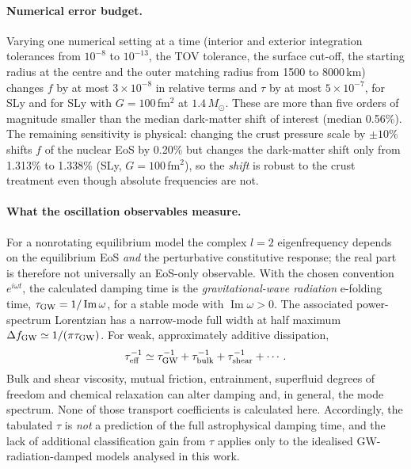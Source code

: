 \documentclass[11pt,a4paper]{article}
\newcommand{\Msun}{M_\odot}
\begin{document}
\paragraph{Numerical error budget.} Varying one numerical setting at a time (interior and exterior integration tolerances from $10^{-8}$ to $10^{-13}$, the TOV tolerance, the surface cut-off, the starting radius at the centre and the outer matching radius from 1500 to 8000\,km) changes $f$ by at most $3\times10^{-8}$ in relative terms and $\tau$ by at most $5\times10^{-7}$, for SLy and for SLy with $G=100$\,fm$^2$ at $1.4\,\Msun$. These are more than five orders of magnitude smaller than the median dark-matter shift of interest (median 0.56\%). The remaining sensitivity is physical: changing the crust pressure scale by $\pm10\%$ shifts $f$ of the nuclear EoS by 0.20\% but changes the dark-matter shift only from 1.313\% to 1.338\% (SLy, $G=100$\,fm$^2$), so the \emph{shift} is robust to the crust treatment even though absolute frequencies are not.
\paragraph{What the oscillation observables measure.}
For a nonrotating equilibrium model the complex $l=2$ eigenfrequency depends on the equilibrium EoS \emph{and} the perturbative constitutive response; the real part is therefore not universally an EoS-only observable. With the chosen convention $e^{i\omega t}$, the calculated damping time is the \emph{gravitational-wave radiation} e-folding time, $\tau_{\rm GW}=1/\operatorname{Im}\omega$, for a stable mode with $\operatorname{Im}\omega>0$. The associated power-spectrum Lorentzian has a narrow-mode full width at half maximum $\Delta f_{\rm GW}\simeq 1/(\pi\tau_{\rm GW})$. For weak, approximately additive dissipation,
\begin{equation}
  \tau_{\rm eff}^{-1}\simeq \tau_{\rm GW}^{-1}+
  \tau_{\rm bulk}^{-1}+\tau_{\rm shear}^{-1}+\cdots .
\end{equation}
Bulk and shear viscosity, mutual friction, entrainment, superfluid degrees of freedom and chemical relaxation can alter damping and, in general, the mode spectrum. None of those transport coefficients is calculated here. Accordingly, the tabulated $\tau$ is \emph{not} a prediction of the full astrophysical damping time, and the lack of additional classification gain from $\tau$ applies only to the idealised GW-radiation-damped models analysed in this work.
\end{document}
